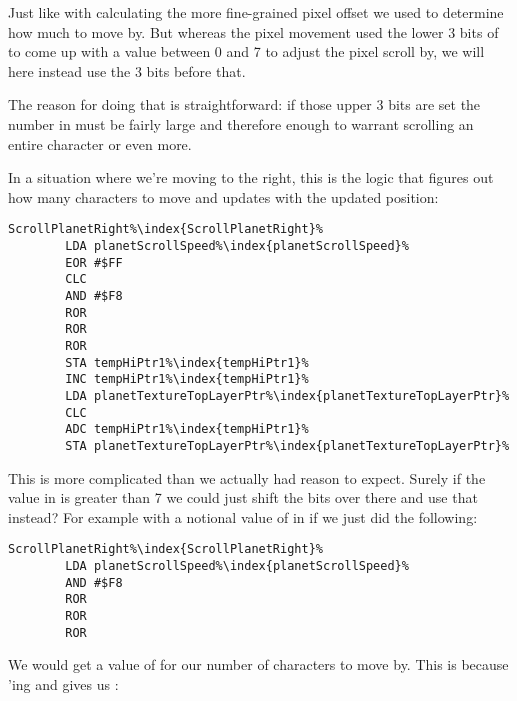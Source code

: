 Just like with calculating the more fine-grained pixel offset we used  to determine
how much to move by. But whereas the pixel movement used the lower 3 bits of  to come
up with a value between 0 and 7 to adjust the pixel scroll by, we will here instead use the 3 bits before that.

The reason for doing that is straightforward: if those upper 3 bits are set the number in 
must be fairly large and therefore enough to warrant scrolling an entire character or even more.

In a situation where we're moving to the right, this is the logic that figures out how many characters to move and
updates  with the updated position:

\begin{lstlisting}[escapechar=\%]
ScrollPlanetRight%\index{ScrollPlanetRight}%   
        LDA planetScrollSpeed%\index{planetScrollSpeed}%
        EOR #$FF
        CLC
        AND #$F8
        ROR
        ROR
        ROR
        STA tempHiPtr1%\index{tempHiPtr1}%
        INC tempHiPtr1%\index{tempHiPtr1}%
        LDA planetTextureTopLayerPtr%\index{planetTextureTopLayerPtr}%
        CLC
        ADC tempHiPtr1%\index{tempHiPtr1}%
        STA planetTextureTopLayerPtr%\index{planetTextureTopLayerPtr}%
\end{lstlisting}

This is more complicated than we actually had reason to expect. Surely if the value in  is
greater than 7 we could just shift the bits over there and use that instead? For example with a notional value of
 in  if we just did the following:

\begin{lstlisting}[escapechar=\%]
ScrollPlanetRight%\index{ScrollPlanetRight}%   
        LDA planetScrollSpeed%\index{planetScrollSpeed}%
        AND #$F8
        ROR
        ROR
        ROR
\end{lstlisting}

We would get a value of  for our number of characters to move by. This is because 'ing
 and  gives us :


